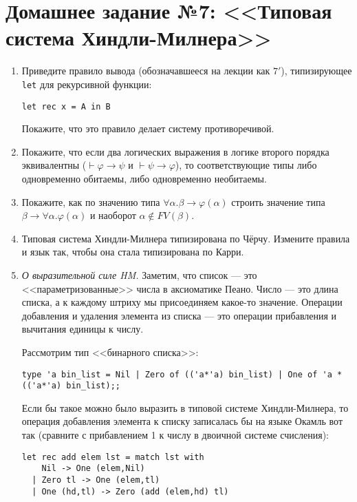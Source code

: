 \documentclass[10pt,a4paper,oneside]{article}
\begin{document}
\section*{Домашнее задание №7: <<Типовая система Хиндли-Милнера>>}
\begin{enumerate}
\item Приведите правило вывода (обозначавшееся на лекции как $7'$), типизирующее \verb!let! для рекурсивной функции:
\begin{verbatim}
let rec x = A in B
\end{verbatim}
Покажите, что это правило делает систему противоречивой.
\item Покажите, что если два логических выражения в логике второго порядка эквивалентны ($\vdash\varphi\rightarrow\psi$ и
$\vdash\psi\rightarrow\varphi$), то соответствующие типы либо одновременно обитаемы, либо одновременно необитаемы.
\item Покажите, как по значению типа $\forall \alpha.\beta\rightarrow\varphi(\alpha)$ строить значение типа
$\beta \rightarrow \forall \alpha.\varphi(\alpha)$ и наоборот $\alpha \notin FV(\beta)$.
\item Типовая система Хиндли-Милнера типизирована по Чёрчу. Измените правила и язык так, чтобы она стала типизирована
по Карри.

\item \emph{О выразительной силе HM.} Заметим, что список --- это <<параметризованные>> числа в 
аксиоматике Пеано. Число --- это длина списка, а к каждому штриху мы присоединяем какое-то значение.
Операции добавления и удаления элемента из списка --- это операции прибавления и вычитания
единицы к числу.

Рассмотрим тип <<бинарного списка>>:

\begin{verbatim}
type 'a bin_list = Nil | Zero of (('a*'a) bin_list) | One of 'a * (('a*'a) bin_list);;
\end{verbatim}

Если бы такое можно было выразить в типовой системе Хиндли-Милнера, то операция добавления
элемента к списку записалась бы на языке Окамль вот так (сравните с прибавлением 1 к числу
в двоичной системе счисления):

\begin{verbatim}
let rec add elem lst = match lst with
    Nil -> One (elem,Nil)
  | Zero tl -> One (elem,tl)
  | One (hd,tl) -> Zero (add (elem,hd) tl)
\end{verbatim}


\end{enumerate}
\end{document}
